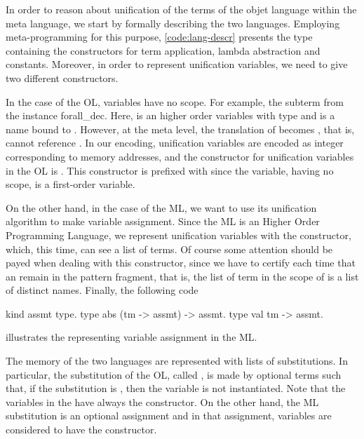 \documentclass[sigconf,natbib=false]{acmart}
\begin{document}
\def\eqfo{eq\_fo\xspace}

In order to reason about unification of the terms of the objet language within the
meta language, we start by formally describing the two languages. Employing
meta-programming for this purpose, \cref{code:lang-descr} presents the type
 containing the constructors for term application, lambda abstraction
and constants. Moreover, in order to represent unification variables, we need 
to give two different constructors. 

In the case of the OL, variables have no scope. For example, the subterm
 from the instance forall\_dec. Here,  is an higher order
variables with type  and  is a name bound to
. However, at the meta level, the translation of  becomes
, that is,  cannot reference . In our
encoding, unification variables are encoded as integer corresponding to memory
addresses, and the constructor for unification variables in the OL is
. This constructor is prefixed with  since the
variable, having no scope, is a first-order variable.

On the other hand, in the case of the ML, we want to use its unification
algorithm to make variable assignment. Since the ML is an Higher Order
Programming Language, we represent unification variables with the 
constructor, which, this time, can see a list of terms. Of course some attention
should be payed when dealing with this constructor, since we have to certify
each time that an  remain in the pattern fragment, that is, the
list of term in the scope of  is a list of distinct names. Finally,
the following code

\begin{elpicode}
  kind assmt type.
  type abs (tm -> assmt) -> assmt.
  type val tm -> assmt.
\end{elpicode}

\noindent
illustrates the  representing variable assignment in the ML. 

The memory of the two languages are represented with lists of substitutions. In
particular, the substitution of the OL, called , is made by
optional terms such that, if the substitution is , then the
variable is not instantiated. Note that the variables in the 
have always the  constructor. On the other hand, the ML
substitution is an optional assignment and in that assignment, variables are
considered to have the  constructor.
\end{document}
